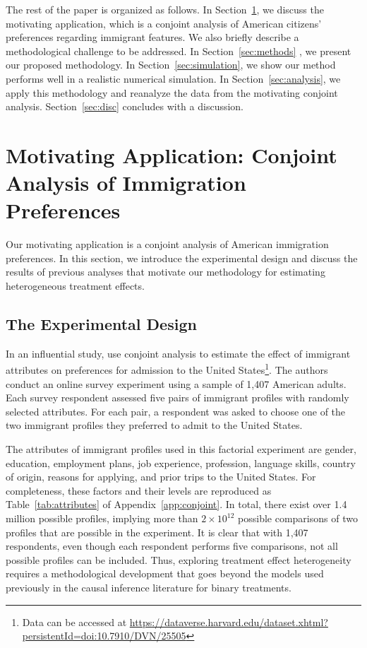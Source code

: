 \documentclass[11pt]{article}
\begin{document}
The rest of the paper is organized as follows.  In
Section~\ref{sec:con}, we discuss the motivating application, which is
a conjoint analysis of American citizens' preferences regarding
immigrant features.  We also briefly describe a methodological
challenge to be addressed.  In Section~\ref{sec:methods} , we present
our proposed methodology. In Section~\ref{sec:simulation}, we show our method performs well in a realistic numerical simulation. In Section~\ref{sec:analysis}, we apply
this methodology and reanalyze the data from the motivating conjoint
analysis.  Section~\ref{sec:disc} concludes with a discussion.

\section{Motivating Application: Conjoint Analysis of Immigration
  Preferences}\label{sec:con}

Our motivating application is a conjoint analysis of American
immigration preferences.  In this section, we introduce the
experimental design and discuss the results of previous analyses that
motivate our methodology for estimating heterogeneous treatment
effects.

\subsection{The Experimental Design}

In an influential study, \cite{hainmueller2015hidden} use conjoint
analysis to estimate the effect of immigrant attributes on preferences
for admission to the United States\footnote{Data can be accessed at \url{https://dataverse.harvard.edu/dataset.xhtml?persistentId=doi:10.7910/DVN/25505}}.  The authors conduct an online
survey experiment using a sample of 1,407 American adults.  Each
survey respondent assessed five pairs of immigrant profiles with
randomly selected attributes.  For each pair, a respondent was asked
to choose one of the two immigrant profiles they preferred to admit to
the United States.

The attributes of immigrant profiles used in this factorial experiment
are gender, education, employment plans, job experience, profession,
language skills, country of origin, reasons for applying, and prior
trips to the United States.  For completeness, these factors and their
levels are reproduced as Table~\ref{tab:attributes} of
Appendix~\ref{app:conjoint}. In total, there exist
over 1.4 million possible profiles, implying more than
$2 \times 10^{12}$ possible comparisons of two profiles that are
possible in the experiment.  It is clear that with 1,407 respondents,
even though each respondent performs five comparisons, not all
possible profiles can be included.  Thus, exploring treatment effect
heterogeneity requires a methodological development that goes beyond
the models used previously in the causal inference literature for
binary treatments.
  
\end{document}
